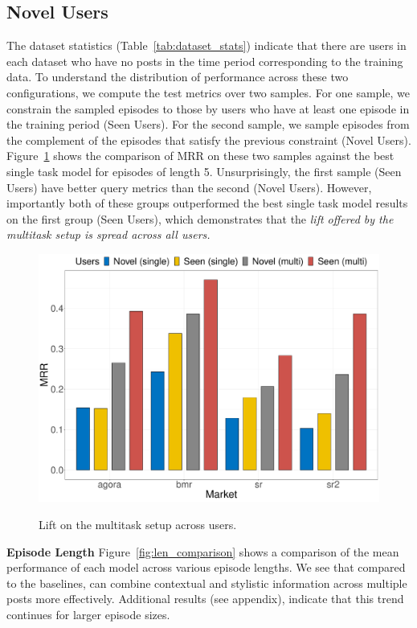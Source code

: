 \subsection{Novel Users}
The dataset statistics (Table~\ref{tab:dataset_stats}) indicate that there are users in each dataset who have no posts in the time period corresponding to the training data. 
To understand the distribution of performance across these two configurations, we compute the test metrics over two samples.
For one sample, we constrain the sampled episodes to those by users who have at least one episode in the training period (Seen Users).
For the second sample, we sample episodes from the complement of the episodes that satisfy the previous constraint (Novel Users).
Figure~\ref{fig:novel_vs_train_comparison} shows the comparison of MRR on these two samples against the best single task model for episodes of length 5. 
Unsurprisingly, the first sample (Seen Users) have better query metrics than the second (Novel Users).
However, importantly both of these groups outperformed the best single task model results on the first group (Seen Users), which demonstrates that the {\it lift offered by the multitask setup is spread across all users.} 

\begin{figure}
    \centering
    \includegraphics[width=0.8\linewidth,alt={Bar chart showing the lift provided by using the multitask setup across both seen and novel users.}]{sysml/plots/novel_vs_train_vs_single.pdf}
    \caption{Lift on the multitask setup across users.}
    \label{fig:novel_vs_train_comparison}
\end{figure}

\noindent \textbf{Episode Length}  Figure~\ref{fig:len_comparison} shows a comparison of the mean performance of each model across various episode lengths. We see that compared to the baselines, \SYSMLmethodname{} can combine contextual and stylistic information across multiple posts more effectively. Additional results (see appendix),  indicate that this trend continues for larger episode sizes.

